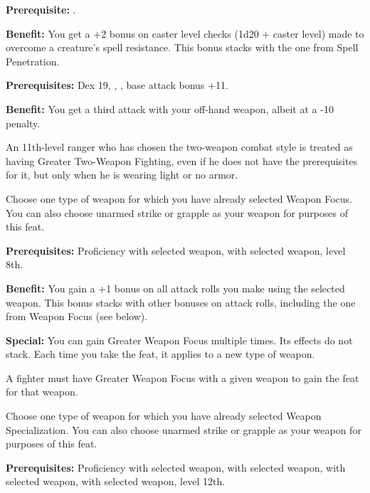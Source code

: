 
\textbf{Prerequisite:} .

\textbf{Benefit:} You get a +2 bonus on caster level checks (1d20 + caster level) 
made to overcome a creature's spell resistance. This bonus stacks with the one 
from Spell Penetration.


\textbf{Prerequisites:} Dex 19, , , 
base attack bonus +11.

\textbf{Benefit:} You get a third attack with your off-hand weapon, albeit at a 
-10 penalty.

An 11th-level ranger who has chosen the two-weapon combat style is treated as having 
Greater Two-Weapon Fighting, even if he does not have the prerequisites for it, 
but only when he is wearing light or no armor.


Choose one type of weapon for which you have already selected Weapon Focus. You 
can also choose unarmed strike or grapple as your weapon for purposes of this feat.

\textbf{Prerequisites:} Proficiency with selected weapon,  with selected 
weapon,  level 8th.

\textbf{Benefit:} You gain a +1 bonus on all attack rolls you make using the selected 
weapon. This bonus stacks with other bonuses on attack rolls, including the one 
from Weapon Focus (see below).

\textbf{Special:} You can gain Greater Weapon Focus multiple times. Its effects 
do not stack. Each time you take the feat, it applies to a new type of weapon.

A fighter must have Greater Weapon Focus with a given weapon to gain the  feat for that weapon. 


Choose one type of weapon for which you have already selected Weapon Specialization. 
You can also choose unarmed strike or grapple as your weapon for purposes of this 
feat.

\textbf{Prerequisites:} Proficiency with selected weapon,  
with selected weapon,  with selected weapon,  
with selected weapon,  level 12th.

